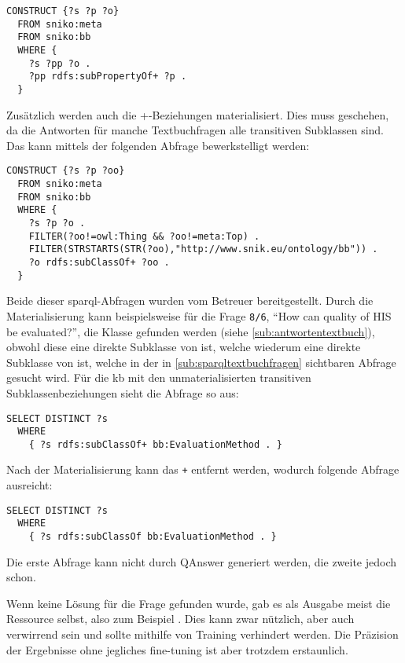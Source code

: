 \begin{lstlisting}[language=SPARQL]
  CONSTRUCT {?s ?p ?o}
  FROM sniko:meta
  FROM sniko:bb
  WHERE {
    ?s ?pp ?o .
    ?pp rdfs:subPropertyOf+ ?p . 
  }
\end{lstlisting}

Zusätzlich werden auch die +-Beziehungen materialisiert.
Dies muss geschehen, da die Antworten für manche Textbuchfragen alle transitiven Subklassen sind.
Das kann mittels der folgenden Abfrage bewerkstelligt werden:

\begin{lstlisting}[language=SPARQL]
  CONSTRUCT {?s ?p ?oo}
  FROM sniko:meta
  FROM sniko:bb
  WHERE {
    ?s ?p ?o . 
    FILTER(?oo!=owl:Thing && ?oo!=meta:Top) .
    FILTER(STRSTARTS(STR(?oo),"http://www.snik.eu/ontology/bb")) .
    ?o rdfs:subClassOf+ ?oo .
  }
\end{lstlisting}

Beide dieser \ac{sparql}-Abfragen wurden vom Betreuer bereitgestellt.
Durch die Materialisierung kann beispielsweise für die Frage \texttt{8/6}, \enquote{How can quality of HIS be evaluated?},
die Klasse  gefunden werden (siehe \cref{sub:antwortentextbuch}), obwohl diese eine direkte Subklasse von  ist,
welche wiederum eine direkte Subklasse von  ist, welche in der in \cref{sub:sparqltextbuchfragen} sichtbaren Abfrage gesucht wird.
Für die \ac{kb} mit den unmaterialisierten transitiven Subklassenbeziehungen sieht die Abfrage so aus:
\begin{lstlisting}[language=SPARQL]
  SELECT DISTINCT ?s
  WHERE
    { ?s rdfs:subClassOf+ bb:EvaluationMethod . }
\end{lstlisting}

Nach der Materialisierung kann das \texttt{+} entfernt werden, wodurch folgende Abfrage ausreicht:
\begin{lstlisting}[language=SPARQL]
  SELECT DISTINCT ?s
  WHERE
    { ?s rdfs:subClassOf bb:EvaluationMethod . }
\end{lstlisting}

Die erste Abfrage kann nicht durch QAnswer generiert werden, die zweite jedoch schon.

Wenn keine Lösung für die Frage gefunden wurde, gab es als Ausgabe meist die Ressource selbst, also zum Beispiel .
Dies kann zwar nützlich, aber auch verwirrend sein und sollte mithilfe von Training verhindert werden.
Die Präzision der Ergebnisse ohne jegliches fine-tuning ist aber trotzdem erstaunlich.

